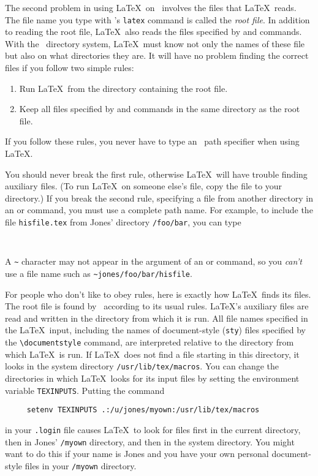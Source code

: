 The second problem in using \LaTeX\ on \UNIX\ involves the files that
\LaTeX\ reads.  The file name you type with \UNIX's {\tt latex}
command is called the {\em root file}.  In addition to reading the root
file, \LaTeX\ also reads the files specified by \hbox{\verb||}
and \hbox{\verb||} commands.  With the \UNIX\ directory system,
\LaTeX\ must know not only the names of these file but also on what
directories they are.  It will have no problem finding the correct
files if you follow two simple rules:
\begin{enumerate}
 \item Run \LaTeX\ from the directory containing the root file.
 \item Keep all files specified by \hbox{\verb||} and 
      \hbox{\verb||} commands in the same directory as the root
       file.
\end{enumerate}
If you follow these rules, you never have to type an \UNIX\ path
specifier when using \LaTeX.

You should never break the first rule, otherwise \LaTeX\ will have
trouble finding auxiliary files.  (To run \LaTeX\ on someone else's
file, copy the file to your directory.) If you break the second
rule, specifying a file from another directory in an
\hbox{\verb||} or \hbox{\verb||} command, you must use a
complete path name.  For example, to include the file \mbox{\tt hisfile.tex} 
from Jones' directory \hbox{\verb|/foo/bar|}, you can type
\begin{verbatim}
     
\end{verbatim}
A \verb|~| character may not appear in the argument of an
\hbox{\verb||} or \hbox{\verb||} command, so you {\em
can't\/} use a file name such as \hbox{\verb|~jones/foo/bar/hisfile|}.

For people who don't like to obey rules, 
here is exactly how \LaTeX\ finds its
files.  The root file is found by \UNIX\ according to its usual rules.
\LaTeX's auxiliary files are read and written in the directory from
which it is run.  All file names specified in the \LaTeX\ input,
including the names of document-style ({\tt sty}) files specified by
the \hbox{\verb|\documentstyle|} command, are interpreted relative to
the directory from which \LaTeX\ is run.  If \LaTeX\ does not find a
file starting in this directory, it looks in the system directory
\hbox{\verb|/usr/lib/tex/macros|}.  You can change the directories in
which \LaTeX\ looks for its input files by setting the environment
variable \mbox{\tt TEXINPUTS}.  Putting the command
\begin{verbatim}
     setenv TEXINPUTS .:/u/jones/myown:/usr/lib/tex/macros
\end{verbatim}
in your \mbox{\tt .login} file causes \LaTeX\ to look for files first
in the current directory, then in Jones' {\tt /myown} directory, and
then in the system directory.  You might want to do this if your name
is Jones and you have your own personal document-style files in your
{\tt /myown} directory. 

